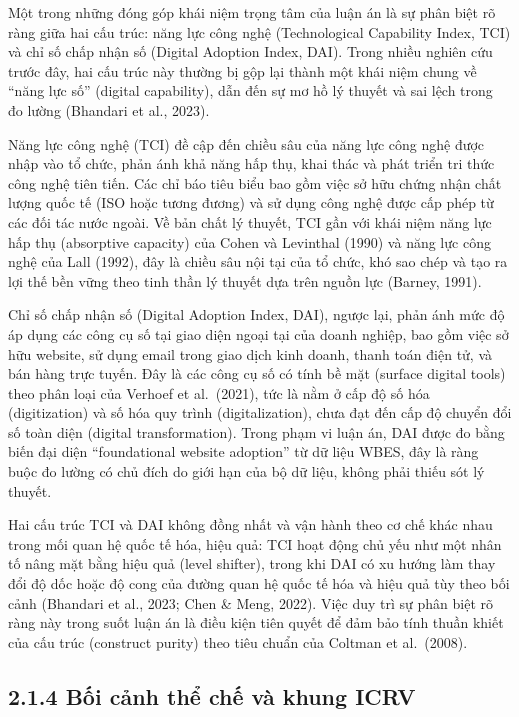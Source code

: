\documentclass[
  a4paper,
  13pt]{extreport}
\begin{document}
Một trong những đóng góp khái niệm trọng tâm của luận án là sự phân biệt
rõ ràng giữa hai cấu trúc: năng lực công nghệ (Technological Capability
Index, TCI) và chỉ số chấp nhận số (Digital Adoption Index, DAI). Trong
nhiều nghiên cứu trước đây, hai cấu trúc này thường bị gộp lại thành một
khái niệm chung về ``năng lực số'' (digital capability), dẫn đến sự mơ
hồ lý thuyết và sai lệch trong đo lường (Bhandari et al., 2023).

Năng lực công nghệ (TCI) đề cập đến chiều sâu của năng lực công nghệ
được nhập vào tổ chức, phản ánh khả năng hấp thụ, khai thác và phát
triển tri thức công nghệ tiên tiến. Các chỉ báo tiêu biểu bao gồm việc
sở hữu chứng nhận chất lượng quốc tế (ISO hoặc tương đương) và sử dụng
công nghệ được cấp phép từ các đối tác nước ngoài. Về bản chất lý
thuyết, TCI gần với khái niệm năng lực hấp thụ (absorptive capacity) của
Cohen và Levinthal (1990) và năng lực công nghệ của Lall (1992), đây là
chiều sâu nội tại của tổ chức, khó sao chép và tạo ra lợi thế bền vững
theo tinh thần lý thuyết dựa trên nguồn lực (Barney, 1991).

Chỉ số chấp nhận số (Digital Adoption Index, DAI), ngược lại, phản ánh
mức độ áp dụng các công cụ số tại giao diện ngoại tại của doanh nghiệp,
bao gồm việc sở hữu website, sử dụng email trong giao dịch kinh doanh,
thanh toán điện tử, và bán hàng trực tuyến. Đây là các công cụ số có
tính bề mặt (surface digital tools) theo phân loại của Verhoef et
al.~(2021), tức là nằm ở cấp độ số hóa (digitization) và số hóa quy
trình (digitalization), chưa đạt đến cấp độ chuyển đổi số toàn diện
(digital transformation). Trong phạm vi luận án, DAI được đo bằng biến
đại diện ``foundational website adoption'' từ dữ liệu WBES, đây là ràng
buộc đo lường có chủ đích do giới hạn của bộ dữ liệu, không phải thiếu
sót lý thuyết.

Hai cấu trúc TCI và DAI không đồng nhất và vận hành theo cơ chế khác
nhau trong mối quan hệ quốc tế hóa, hiệu quả: TCI hoạt động chủ yếu như
một nhân tố nâng mặt bằng hiệu quả (level shifter), trong khi DAI có xu
hướng làm thay đổi độ dốc hoặc độ cong của đường quan hệ quốc tế hóa và
hiệu quả tùy theo bối cảnh (Bhandari et al., 2023; Chen \& Meng, 2022).
Việc duy trì sự phân biệt rõ ràng này trong suốt luận án là điều kiện
tiên quyết để đảm bảo tính thuần khiết của cấu trúc (construct purity)
theo tiêu chuẩn của Coltman et al.~(2008).

\hypertarget{bux1ed1i-cux1ea3nh-thux1ec3-chux1ebf-vuxe0-khung-icrv}{%
\subsection{2.1.4 Bối cảnh thể chế và khung
ICRV}\label{bux1ed1i-cux1ea3nh-thux1ec3-chux1ebf-vuxe0-khung-icrv}}
\end{document}
